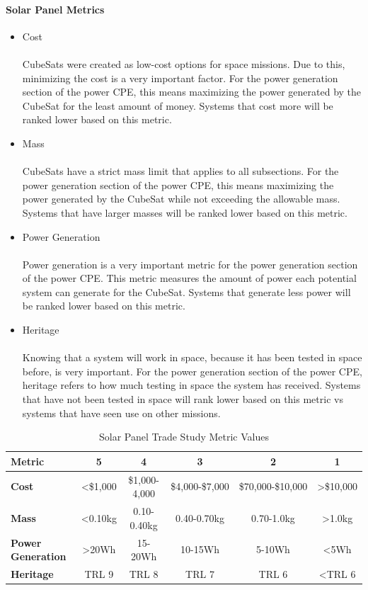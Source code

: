 \paragraph{Solar Panel Metrics}
\begin{itemize}
\item Cost\\
\\
CubeSats were created as low-cost options for space missions.  Due to this, minimizing the cost is a very important factor.  For the power generation section of the power CPE,  this means maximizing the power generated by the CubeSat for the least amount of money.  Systems that cost more will be ranked lower based on this metric.
\item{Mass} \\
\\
CubeSats have a strict mass limit that applies to all subsections.  For the power generation section of the power CPE, this means maximizing the power generated by the CubeSat while not exceeding the allowable mass.  Systems that have larger masses will be ranked lower based on this metric.
\item{Power Generation} \\
\\
Power generation is a very important metric for the power generation section of the power CPE.  This metric measures the amount of power each potential system can generate for the CubeSat.  Systems that generate less power will be ranked lower based on this metric.
\item{Heritage} \\
\\
Knowing that a system will work in space, because it has been tested in space before, is very important. For the power generation section of the power CPE, heritage refers to how much testing in space the system has received.  Systems that have not been tested in space will rank lower based on this metric vs systems that have seen use on other missions.
\end{itemize}
\begin{table}[H]
\centering
\begin{tabular}{|l|c|c|c|c|c|} 
\hline
    \textbf{Metric} & \textbf{5} & \textbf{4} & \textbf{3} & \textbf{2} & \textbf{1}
    \\
\hline
    \textbf{Cost} & <\$1,000 & \$1,000-4,000 & \$4,000-\$7,000 & \$70,000-\$10,000 & >\$10,000 
    \\
\hline
    \textbf{Mass} & <0.10kg & 0.10-0.40kg & 0.40-0.70kg & 0.70-1.0kg & >1.0kg 
    \\    
\hline
    \textbf{Power Generation} & >20Wh & 15-20Wh & 10-15Wh & 5-10Wh & <5Wh 
    \\
\hline
    \textbf{Heritage} & TRL 9 & TRL 8 & TRL 7 & TRL 6 & <TRL 6 
    \\
\hline
\end{tabular}
\caption{Solar Panel Trade Study Metric Values}
\label{tbl:SolarPanel_Metric_Scores}
\end{table}
